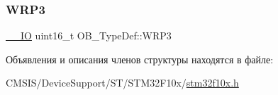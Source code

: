 \subsubsection{\texorpdfstring{WRP3}{WRP3}}
{\footnotesize\ttfamily \mbox{\hyperlink{group___c_m_s_i_s___c_m3__core__definitions_gaec43007d9998a0a0e01faede4133d6be}{\+\_\+\+\_\+\+IO}} uint16\+\_\+t O\+B\+\_\+\+Type\+Def\+::\+W\+R\+P3}



Объявления и описания членов структуры находятся в файле\+:\begin{DoxyCompactItemize}
\item 
C\+M\+S\+I\+S/\+Device\+Support/\+S\+T/\+S\+T\+M32\+F10x/\mbox{\hyperlink{stm32f10x_8h}{stm32f10x.\+h}}\end{DoxyCompactItemize}
